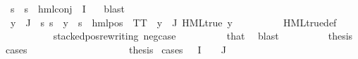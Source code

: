 \begin{isabellebody}
\ {\isacartoucheopen}{\isasymforall}s{\isachardot}{\kern0pt}\ {\isasymnot}\ s\ {\isasymTurnstile}\ hml{\isacharunderscore}{\kern0pt}conj\ {\isacharbraceleft}{\kern0pt}{\isacharbraceright}{\kern0pt}\ I\ {\isasymPsi}{\isacartoucheclose}\ \isamarkupfalse%
\ blast\isanewline
\ \ \ \ \isamarkupfalse%
\isanewline
\ \ \ \ \ \ \isamarkupfalse%
\ {}\isanewline
\ \ \ \ \ \ \isamarkupfalse%
\ {\isachardoublequoteopen}{\isasymforall}y\ {\isasymin}\ {\isasymPhi}{\isacharbackquote}{\kern0pt}J{\isachardot}{\kern0pt}\ {\isasymexists}{\isasymalpha}{\isachardot}{\kern0pt}\ {\isacharparenleft}{\kern0pt}{\isasymforall}s{\isachardot}{\kern0pt}\ {\isacharparenleft}{\kern0pt}s\ {\isasymTurnstile}\ y{\isacharparenright}{\kern0pt}\ {\isasymlongleftrightarrow}\ {\isacharparenleft}{\kern0pt}s\ {\isasymTurnstile}\ {\isacharparenleft}{\kern0pt}hml{\isacharunderscore}{\kern0pt}pos\ {\isasymalpha}\ TT{\isacharparenright}{\kern0pt}{\isacharparenright}{\kern0pt}{\isacharparenright}{\kern0pt}{\isachardoublequoteclose}\ {\isacharbar}{\kern0pt}\ {\isachardoublequoteopen}{\isacharparenleft}{\kern0pt}{\isasymexists}y{\isasymin}{\isasymPhi}\ {\isacharbackquote}{\kern0pt}\ J{\isachardot}{\kern0pt}\ HML{\isacharunderscore}{\kern0pt}true\ y{\isacharparenright}{\kern0pt}{\isachardoublequoteclose}\isanewline
\ \ \ \ \ \ \ \ \isamarkupfalse%
\ HML{\isacharunderscore}{\kern0pt}true{\isacharunderscore}{\kern0pt}def\isanewline
\ \ \ \ \ \ \ \ \isamarkupfalse%
\ stacked{\isacharunderscore}{\kern0pt}pos{\isacharunderscore}{\kern0pt}rewriting\ neg{\isacharunderscore}{\kern0pt}case\isanewline
\ \ \ \ \ \ \ \ \isamarkupfalse%
\ that{\isacharparenleft}{\kern0pt}{}{\isacharparenright}{\kern0pt}\ \isamarkupfalse%
\ blast\isanewline
\ \ \ \ \ \ \isamarkupfalse%
\ \isamarkupfalse%
\ {\isacharquery}{\kern0pt}thesis\ \isamarkupfalse%
{\isacharparenleft}{\kern0pt}cases{\isacharparenright}{\kern0pt}\isanewline
\ \ \ \ \ \ \ \ \isamarkupfalse%
\ {}\isanewline
\ \ \ \ \ \ \ \ \isamarkupfalse%
\ {\isacharquery}{\kern0pt}thesis\ \isamarkupfalse%
{\isacharparenleft}{\kern0pt}cases\ {\isachardoublequoteopen}{\isasymPhi}\ {\isacharbackquote}{\kern0pt}\ I\ {\isasyminter}\ {\isasymPhi}\ {\isacharbackquote}{\kern0pt}\ J\ {\isacharequal}{\kern0pt}\ {\isacharbraceleft}{\kern0pt}{\isacharbraceright}{\kern0pt}{\isachardoublequoteclose}{\isacharparenright}{\kern0pt}\isanewline

\end{isabellebody}
